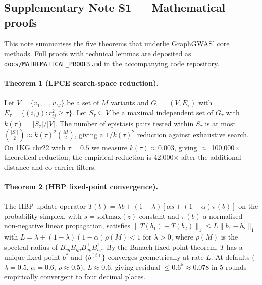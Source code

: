 \clearpage


\subsection*{Supplementary Note S1 --- Mathematical proofs}\label{snote:proofs}

This note summarises the five theorems that underlie GraphGWAS'
core methods. Full proofs with technical lemmas are deposited as
\texttt{docs/MATHEMATICAL\_PROOFS.md} in the accompanying code
repository.

\paragraph{Theorem 1 (LPCE search-space reduction).}
Let $V = \{v_1, \dots, v_M\}$ be a set of $M$ variants and
$G_\tau = (V, E_\tau)$ with $E_\tau = \{(i,j) : r^2_{ij} \geq \tau\}$.
Let $S_\tau \subseteq V$ be a maximal independent set of $G_\tau$
with $k(\tau) = |S_\tau|/|V|$. The number of epistasis pairs tested
within $S_\tau$ is at most
$\binom{|S_\tau|}{2} \approx k(\tau)^2 \binom{M}{2}$, giving a
$1/k(\tau)^2$ reduction against exhaustive search. On 1KG chr22
with $\tau{=}0.5$ we measure $k(\tau) \approx 0.003$, giving
$\approx$ 100{,}000$\times$ theoretical reduction; the empirical
reduction is 42{,}000$\times$ after the additional distance and
co-carrier filters.

\paragraph{Theorem 2 (HBP fixed-point convergence).}
The HBP update operator
$T(b) = \lambda b + (1-\lambda)[\alpha s + (1-\alpha) \pi(b)]$ on
the probability simplex, with $s = \text{softmax}(z)$ constant and
$\pi(b)$ a normalised non-negative linear propagation, satisfies
$\|T(b_1) - T(b_2)\|_1 \leq L \|b_1 - b_2\|_1$ with
$L = \lambda + (1-\lambda)(1-\alpha) \rho(M) < 1$ for $\lambda > 0$,
where $\rho(M)$ is the spectral radius of
$B_{vg} B_{gp} B_{gp}^\top B_{vg}^\top$. By the Banach fixed-point
theorem\cite{banach1922operations}, $T$ has a unique fixed point
$b^*$ and $\{b^{(t)}\}$ converges geometrically at rate $L$. At defaults
($\lambda{=}0.5$, $\alpha{=}0.6$, $\rho \approx 0.5$),
$L \approx 0.6$, giving residual $\leq 0.6^5 \approx 0.078$ in 5
rounds---empirically convergent to four decimal places.


